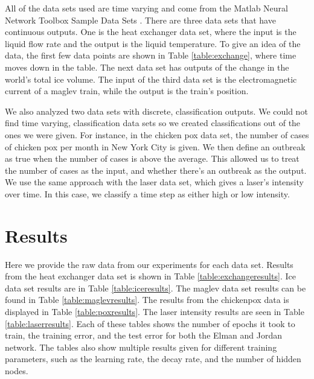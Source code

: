 \documentclass{acm_proc_article-sp}
\newcommand{\todo}[1]{\textcolor{orange}{\textbf{TODO}: #1}} %
\begin{document}
All of the data sets used are time varying and come from the Matlab Neural Network Toolbox Sample Data Sets \cite{data}. 
There are three data sets that have continuous outputs. One is the heat exchanger data set, where the input is the liquid flow rate and the output is the liquid temperature. 
To give an idea of the data, the first few data points are shown in Table \ref{table:exchange}, where time moves down in the table. 
The next data set has outputs of the change in the world's total ice volume. %
The input of the third data set is the electromagnetic current of a maglev train, while the output is the train's position.

We also analyzed two data sets with discrete, classification outputs. We could not find time varying, classification data sets so we created classifications out of the ones we were given. For instance, in the chicken pox data set, the number of cases of chicken pox per month in New York City is given. We then define an outbreak as true when the number of cases is above the average. This allowed us to treat the number of cases as the input, and whether there's an outbreak as the output. We use the same approach with the laser data set, which gives a laser's intensity over time. In this case, we classify a time step as either high or low intensity.


\section{Results}
Here we provide the raw data from our experiments for each data set. Results from the heat exchanger data set is shown in Table \ref{table:exchangeresults}. Ice data set results are in Table \ref{table:iceresults}. The maglev data set results can be found in Table \ref{table:maglevresults}. The results from the chickenpox data is displayed in Table \ref{table:poxresults}. The laser intensity results are seen in Table \ref{table:laserresults}. Each of these tables shows the number of epochs it took to train, the training error, and the test error for both the Elman and Jordan network. The tables also show multiple results given for different training parameters, such as the learning rate, the decay rate, and the number of hidden nodes. 
\end{document}
